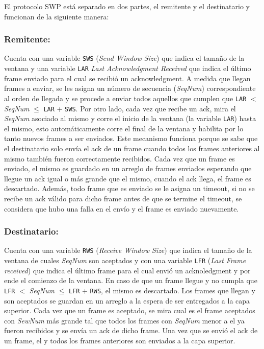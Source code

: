 \documentclass[10pt,a4paper]{article}
\begin{document}
El protocolo SWP está separado en dos partes, el remitente y el destinatario y funcionan de la siguiente manera:

\subsubsection{Remitente:}
Cuenta con una variable \texttt{SWS} (\textit{Send Window Size}) que indica el tamaño de la ventana y una variable \texttt{LAR} \textit{Last Acknowledgment Received} que indica el último frame enviado para el cual se recibió un acknowledgment. A medida que llegan frames a enviar, se les asigna un número de secuencia (\textit{SeqNum}) correspondiente al orden de llegada y se procede a enviar todos aquellos que cumplen que \texttt{LAR} $<$ \textit{SeqNum} $\leq$ \texttt{LAR} + \texttt{SWS}. Por otro lado, cada vez que recibe un ack, mira el \textit{SeqNum} asociado al mismo y corre el inicio de la ventana (la variable \texttt{LAR}) hasta el mismo, esto automáticamente corre el final de la ventana y habilita por lo tanto nuevos frames a ser enviados. Este mecanismo funciona porque se sabe que el destinatario solo envía el ack de un frame cuando todos los frames anteriores al mismo también fueron correctamente recibidos. Cada vez que un frame es enviado, el mismo es guardado en un arreglo de frames enviados esperando que llegue un ack igual o más grande que el mismo, cuando el ack llega, el frame es descartado. Además, todo frame que es enviado se le asigna un timeout, si no se recibe un ack válido para dicho frame antes de que se termine el timeout, se considera que hubo una falla en el envío y el frame es enviado nuevamente.

\subsubsection{Destinatario:}
Cuenta con una variable \texttt{RWS} (\textit{Receive Window Size}) que indica el tamaño de la ventana de cuales \textit{SeqNum} son aceptados y con una variable \texttt{LFR} (\textit{Last Frame received}) que indica el último frame para el cual envió un acknoledgment y por ende el comienzo de la ventana. En caso de que un frame llegue y no cumpla que \texttt{LFR} $<$ \textit{SeqNum} $\leq$ \texttt{LFR} + \texttt{RWS}, el mismo es descartado. Los frames que llegan y son aceptados se guardan en un arreglo a la espera de ser entregados a la capa superior. Cada vez que un frame es aceptado, se mira cual es el frame aceptados con \textit{SewNum} más grande tal que todos los frames con \textit{SeqNum} menor a el ya fueron recibidos y se envía un ack de dicho frame. Una vez que se envió el ack de un frame, el y todos los frames anteriores son enviados a la capa superior. \\
\end{document}
